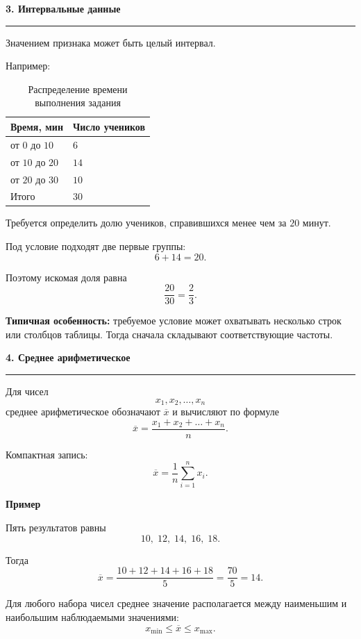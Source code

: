 \documentclass[a4paper,12pt]{article}
\newcommand{\sectiontitle}[1]{%
    \vspace{0.4em}
    {\Large\bfseries\color{darkaccent}#1\par}
    \vspace{0.25em}
    {\color{linegray}\rule{\linewidth}{0.6pt}}
    \vspace{0.7em}
}
\newcommand{\subsectiontitle}[1]{%
    \vspace{0.5em}
    {\large\bfseries\color{accent}#1\par}
    \vspace{0.25em}
}
\newcommand{\important}[1]{%
    {\color{darkaccent}\bfseries #1}
}
\begin{document}

\sectiontitle{3. Интервальные данные}

Значением признака может быть целый интервал.

Например:

\begin{table}[ht]
\centering
\caption{Распределение времени выполнения задания}
\begin{tabularx}{0.78\linewidth}{>{\centering\arraybackslash}X
                                >{\centering\arraybackslash}X}
\toprule
Время, мин & Число учеников \\
\midrule
от \(0\) до \(10\) & \(6\) \\
от \(10\) до \(20\) & \(14\) \\
от \(20\) до \(30\) & \(10\) \\
\midrule
Итого & \(30\) \\
\bottomrule
\end{tabularx}
\end{table}

Требуется определить долю учеников, справившихся менее чем за \(20\) минут.

Под условие подходят две первые группы:
\[
6+14=20.
\]

Поэтому искомая доля равна
\[
\frac{20}{30}=\frac23.
\]

\important{Типичная особенность:} требуемое условие может охватывать несколько
строк или столбцов таблицы. Тогда сначала складывают соответствующие частоты.


\sectiontitle{4. Среднее арифметическое}

Для чисел
\[
x_1,x_2,\ldots,x_n
\]
среднее арифметическое обозначают \(\overline{x}\) и вычисляют по формуле
\[
\boxed{
\overline{x}
=
\frac{x_1+x_2+\ldots+x_n}{n}
}.
\]

Компактная запись:
\[
\boxed{
\overline{x}
=
\frac{1}{n}\sum_{i=1}^{n}x_i
}.
\]

\subsectiontitle{Пример}

Пять результатов равны
\[
10,\;12,\;14,\;16,\;18.
\]

Тогда
\[
\overline{x}
=
\frac{10+12+14+16+18}{5}
=
\frac{70}{5}
=
14.
\]

Для любого набора чисел среднее значение располагается между наименьшим и
наибольшим наблюдаемыми значениями:
\[
x_{\min}\le \overline{x}\le x_{\max}.
\]
\end{document}
